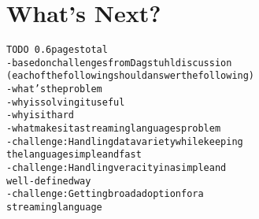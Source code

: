 \section{What's Next?}\label{sec:whatsnext}

\begin{alltt}TODO\scriptsize ~0.6 pages total
- based on challenges from Dagstuhl discussion
  (each of the following should answer the following)
  - what's the problem
  - why is solving it useful
  - why is it hard
  - what makes it a streaming languages problem
- challenge: Handling data variety while keeping
  the language simple and fast
- challenge: Handling veracity in a simple and
  well-defined way 
- challenge: Getting broad adoption for a
  streaming language
\end{alltt}
